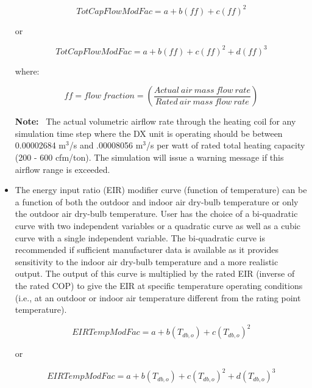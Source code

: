 \begin{itemize}
\begin{equation}
TotCapFlowModFac = a + b\left( {ff} \right) + c{\left( {ff} \right)^2}
\end{equation}

or

\begin{equation}
TotCapFlowModFac = a + b\left( {ff} \right) + c{\left( {ff} \right)^2} + d{\left( {ff} \right)^3}
\end{equation}

where:

\begin{equation}
ff = flow~fraction = \left( {\frac{{Actual~air~mass~flow~rate}}{{Rated~air~mass~flow~rate}}} \right)
\end{equation}

\textbf{Note:}~ The actual volumetric airflow rate through the heating coil for any simulation time step where the DX unit is operating should be between 0.00002684 m\(^{3}\)/s and .00008056 m\(^{3}\)/s per watt of rated total heating capacity (200 - 600 cfm/ton). The simulation will issue a warning message if this airflow range is exceeded.

  \item
The energy input ratio (EIR) modifier curve (function of temperature) can be a function of both the outdoor and indoor air dry-bulb temperature or only the outdoor air dry-bulb temperature. User has the choice of a bi-quadratic curve with two independent variables or a quadratic curve as well as a cubic curve with a single independent variable. The bi-quadratic curve is recommended if sufficient manufacturer data is available as it provides sensitivity to the indoor air dry-bulb temperature and a more realistic output. The output of this curve is multiplied by the rated EIR (inverse of the rated COP) to give the EIR at specific temperature operating conditions (i.e., at an outdoor or indoor air temperature different from the rating point temperature).

\begin{equation}
EIRTempModFac = a + b\left( {{T_{db,o}}} \right) + c{\left( {{T_{db,o}}} \right)^2}
\end{equation}

or

\begin{equation}
EIRTempModFac = a + b\left( {{T_{db,o}}} \right) + c{\left( {{T_{db,o}}} \right)^2} + d{\left( {{T_{db,o}}} \right)^3}
\end{equation}


\end{itemize}
